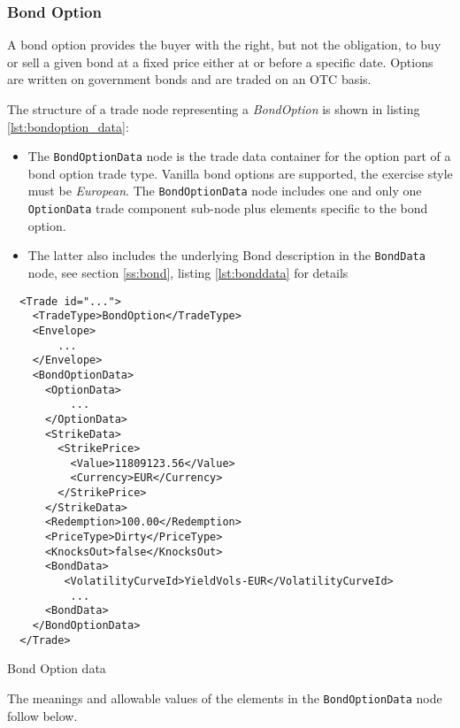 \subsubsection{Bond Option}
\label{ss:bondoption}

A bond option provides the buyer with the right, but not the
obligation, to buy or sell a given bond at a fixed price either at or
before a specific date. Options are written on government bonds and
are traded on an OTC basis.

The structure of a trade node representing a \emph{BondOption}  is shown in
listing \ref{lst:bondoption_data}: 
\begin{itemize}
\item The \lstinline!BondOptionData!  node is the trade data container for
the option part of a bond option trade type. Vanilla bond 
options are supported, the exercise style must be \emph{European}. 
The \lstinline!BondOptionData!  node includes one and 
only one \lstinline!OptionData! trade component sub-node plus elements
specific to the bond option. 
\item The latter also includes the underlying Bond description in the \lstinline!BondData!
  node, see section \ref{ss:bond}, listing \ref{lst:bonddata} for details
\end{itemize}

\begin{listing}[H]
\begin{verbatim}
  <Trade id="...">
    <TradeType>BondOption</TradeType>
    <Envelope>
        ...
    </Envelope>
    <BondOptionData>
      <OptionData>
          ...
      </OptionData>
      <StrikeData>
        <StrikePrice>
          <Value>11809123.56</Value>
          <Currency>EUR</Currency>
        </StrikePrice>
      </StrikeData>
      <Redemption>100.00</Redemption>
      <PriceType>Dirty</PriceType>
      <KnocksOut>false</KnocksOut>
      <BondData>
         <VolatilityCurveId>YieldVols-EUR</VolatilityCurveId>
          ...
      <BondData>
    </BondOptionData>
  </Trade>
\end{verbatim}
\caption{Bond Option data}
\label{lst:bondoption_data}
\end{listing}

The meanings and allowable values of the elements in the \lstinline!BondOptionData!  node follow below.

